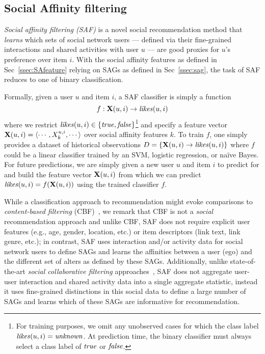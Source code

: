 
\subsection{Social Affinity filtering}

\emph{Social affinity filtering (SAF)} is a novel social
recommendation method that \emph{learns} which sets of social network
users --- defined via their fine-grained interactions and shared
activities with user $u$ --- are good proxies for $u$'s preference
over item $i$.  With the social affinity features as defined in
Sec~\ref{ssec:SAfeature} relying on SAGs as defined in
Sec~\ref{ssec:sag}, the task of SAF reduces to one of binary
classification.

Formally, given a user $u$ and item $i$, a SAF classifier is simply a
function 
\begin{equation*}
f: \x(u,i) \to \likes(u,i)
\end{equation*}
where we restrict $\likes(u,i) \in \{ \true, \false \}$\footnote{For
  training purposes, we omit any unobserved cases for which the class
  label $\likes(u,i)=\unknown$.  At prediction time, the binary
  classifier must always select a class label of $\true$ or $\false$.}
and specify a feature vector $\x(u,i) = \langle
\cdots,X^{u,i}_{k},\cdots \rangle$ over social affinity features
$k$.  To train $f$, one simply provides a dataset of historical
observations $D = \{ \x(u,i) \to \likes(u,i) \}$ where $f$ could be a
linear classifier trained by an SVM, logistic regression, or na\"{i}ve
Bayes.  For future predictions, we are simply given a new user $u$ and
item $i$ to predict for and build the feature vector $\x(u,i)$ from
which we can predict $\likes(u,i) = f(\x(u,i))$ using the trained
classifier $f$.

While a classification approach to recommendation might evoke
comparisons to \emph{content-based filtering} (CBF)~\cite{newsweeder},
we remark that CBF is not a \emph{social} recommendation approach and
unlike CBF, SAF does not require explicit user features (e.g., age,
gender, location, etc.) or item descriptors (link text, link genre,
etc.); in contrast, SAF uses interaction and/or activity data for
social network users to define SAGs and learns the affinities between
a user (ego) and the different set of alters as defined by these SAGs.
Additionally, unlike state-of-the-art \emph{social collaborative filtering} 
approaches~\cite{socinf,rrmf,ste,sorec,sr,Noel2012NOF,lla}, SAF does
not aggregate user-user interaction and shared activity data into a
single aggregate statistic, instead it uses fine-grained distinctions
in this social data to define a large number of SAGs and learns which
of these SAGs are informative for recommendation.


